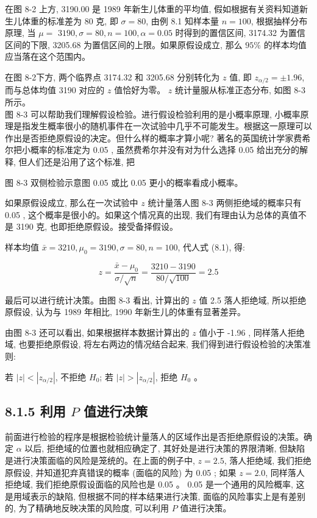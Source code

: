 \documentclass[10pt]{article}
\begin{document}
\begin{CJK*}{UTF8}{bsmi}
在图 8-2 上方, 3190.00 是 1989 年新生儿体重的平均值, 假如根据有关资料知道新生儿体重的标准差为 80 克, 即 $\sigma=80$, 由例 8.1 知样本量 $n=100$, 根据抽样分布原理, 当 $\mu=$ $3190, \sigma=80, n=100, \alpha=0.05$ 时得到的置信区间, 3174.32 为置信区间的下限, 3205.68 为置信区间的上限。如果原假设成立, 那么 $95 \%$ 的样本均值应当落在这个范围内。

在图 8-2下方, 两个临界点 3174.32 和 3205.68 分别转化为 $z$ 值, 即 $z_{\alpha / 2}= \pm 1.96$,而与总体均值 3190 对应的 $z$ 值恰好为零。 $z$ 统计量服从标准正态分布, 如图 8-3 所示。\\
图 8-3 可以帮助我们理解假设检验。进行假设检验利用的是小概率原理, 小概率原理是指发生概率很小的随机事件在一次试验中几乎不可能发生。根据这一原理可以作出是否拒绝原假设的决定。但什么样的概率才算小呢? 著名的英国统计学家费希尔把小概率的标准定为 0.05 , 虽然费希尔并没有对为什么选择 0.05 给出充分的解释, 但人们还是沿用了这个标准, 把

\begin{center}
\end{center}

图 8-3 双侧检验示意图 0.05 或比 0.05 更小的概率看成小概率。

如果原假设成立, 那么在一次试验中 $z$ 统计量落人图 8-3 两侧拒绝域的概率只有 0.05 , 这个概率是很小的。如果这个情况真的出现, 我们有理由认为总体的真值不是 3190 克, 也即拒绝原假设。接受备择假设。

样本均值 $\bar{x}=3210, \mu_{0}=3190, \sigma=80, n=100$, 代人式 (8.1), 得:

$$
z=\frac{\bar{x}-\mu_{0}}{\sigma / \sqrt{n}}=\frac{3210-3190}{80 / \sqrt{100}}=2.5
$$

最后可以进行统计决策。由图 8-3 看出, 计算出的 $z$ 值 2.5 落人拒绝域, 所以拒绝原假设, 认为与 1989 年相比, 1990 年新生儿的体重有显著差异。

由图 8-3 还可以看出, 如果根据样本数据计算出的 $z$ 值小于 -1.96 , 同样落人拒绝域, 也要拒绝原假设, 将左右两边的情况结合起来, 我们得到进行假设检验的决策准则:

若 $|z|<\left|z_{\alpha / 2}\right|$, 不拒绝 $H_{0}$; 若 $|z|>\left|z_{\alpha / 2}\right|$, 拒绝 $H_{0}$ 。

\subsection*{8.1.5 利用 $P$ 值进行决策}
前面进行检验的程序是根据检验统计量落人的区域作出是否拒绝原假设的决策。确定 $\alpha$ 以后, 拒绝域的位置也就相应确定了, 其好处是进行决策的界限清晰, 但缺陷是进行决策面临的风险是笼统的。在上面的例子中, $z=2.5$, 落人拒绝域, 我们拒绝原假设, 并知道犯弃真错误的概率 (面临的风险) 为 0.05 ; 如果 $z=2.0$, 同样落人拒绝域, 我们拒绝原假设面临的风险也是 0.05 。 0.05 是一个通用的风险概率, 这是用域表示的缺陷, 但根据不同的样本结果进行决策, 面临的风险事实上是有差别的, 为了精确地反映决策的风险度, 可以利用 $P$ 值进行决策。


\end{CJK*}
\end{document}
